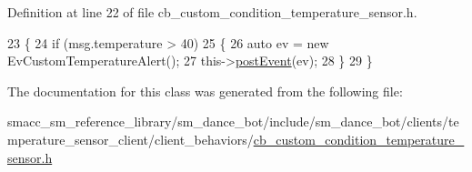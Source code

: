 Definition at line 22 of file cb\+\_\+custom\+\_\+condition\+\_\+temperature\+\_\+sensor.\+h.


\begin{DoxyCode}
23   \{
24     \textcolor{keywordflow}{if} (msg.temperature > 40)
25     \{
26       \textcolor{keyword}{auto} ev = \textcolor{keyword}{new} EvCustomTemperatureAlert();
27       this->\hyperlink{classsmacc_1_1SmaccClientBehavior_a3152cd2215ebc0e387a8a546de07cded}{postEvent}(ev);
28     \}
29   \}
\end{DoxyCode}


The documentation for this class was generated from the following file\+:\begin{DoxyCompactItemize}
\item 
smacc\+\_\+sm\+\_\+reference\+\_\+library/sm\+\_\+dance\+\_\+bot/include/sm\+\_\+dance\+\_\+bot/clients/temperature\+\_\+sensor\+\_\+client/client\+\_\+behaviors/\hyperlink{cb__custom__condition__temperature__sensor_8h}{cb\+\_\+custom\+\_\+condition\+\_\+temperature\+\_\+sensor.\+h}\end{DoxyCompactItemize}

